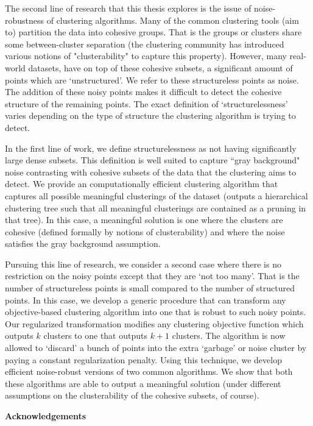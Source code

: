 \documentclass[letterpaper,12pt,titlepage,oneside,final]{book}
\let\origdoublepage\cleardoublepage
\newcommand{\clearemptydoublepage}{%
  \clearpage{\pagestyle{empty}\origdoublepage}}
\let\cleardoublepage\clearemptydoublepage
\begin{document}
The second line of research that this thesis explores is the issue of noise-robustness of clustering algorithms. Many of the common clustering tools (aim to) partition the data into cohesive groups. That is the groups or clusters share some between-cluster separation (the clustering community has introduced various notions of "clusterability" to capture this property). However, many real-world datasets, have on top of these cohesive subsets, a significant amount of points which are `unstructured'. We refer to these structureless points as noise. The addition of these noisy points makes it difficult to detect the cohesive structure of the remaining points. The exact definition of `structurelessness' varies depending on the type of structure the clustering algorithm is trying to detect. 

In the first line of work, we define structurelessness as not having significantly large dense subsets. This definition is well suited to capture ``gray background" noise contrasting with cohesive subsets of the data that the clustering aims to detect. We provide an computationally efficient clustering algorithm that captures all possible meaningful clusterings of the dataset (outputs a hierarchical clustering tree such that all meaningful clusterings are contained as a pruning in that tree). In this case, a meaningful solution is one where the clusters are cohesive (defined formally by notions of clusterability) and where the noise satisfies the gray background assumption. 

Pursuing this line of research, we consider a second case where there is no restriction on the noisy points except that they are `not too many'. That is the number of structureless points is small compared to the number of structured points. In this case, we develop a generic procedure that can transform any objective-based clustering algorithm into one that is robust to such noisy points. Our regularized transformation modifies any clustering objective function which outputs $k$ clusters to one that outputs $k+1$ clusters. The algorithm is now allowed to ‘discard’ a bunch of points into the extra ‘garbage’ or noise cluster by paying a constant regularization penalty. Using this technique, we develop efficient noise-robust versions of two common algorithms. We show that both these algorithms are able to output a meaningful solution (under different assumptions on the clusterability of the cohesive subsets, of course).    

\cleardoublepage

\begin{center}\textbf{Acknowledgements}\end{center}
\end{document}
